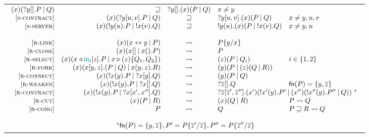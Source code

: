 \begin{table}
\begin{tabular}{@{}c@{}}
\begin{math}
\begin{array}{rrcll}
            \Cut\x{\Weaken\y.P}{Q} & \pcong & \Weaken\y.\Cut\x{P}{Q} & x \ne y \\
            \SContract &
            \Cut\x{\Contract\y\u\v.P}{Q} & \pcong & \Contract\y\u\v.\Cut\x{P}{Q} & x \ne y,u,v \\
            \SServer &
            \Cut\x{\Server\y\u.P}{\Server\x\v.Q} & \pcong & \Server\y\u.\Cut\x{P}{\Server\x\v.Q} & x \ne y,u \\
            \\
            \RLink &
            \Cut\x{\Link\x\y}{P} & \red & P\subst\y\x \\
            \RClose &
            \Cut\x{\Close\x}{\Wait\x.P} & \red & P \\
            \RSelect &
            \Cut\x{\Select\x{\InTag_i}\z.P}{\Case\x\z{Q_1}{Q_2}} & \red & \Cut\z{P}{Q_i} & i\in\set{1,2} \\
            \RFork &
            \Cut\x{\Fork\x\y\z{P}{Q}}{\Join\x\y\z.R} & \red & \Cut\y{P}{\Cut\z{Q}{R}} \\
            \RConnect &
            \Cut\x{\Server\x\y.P}{\Client\x\y.Q} & \red & \Cut\y{P}{Q} \\
            \RWeaken &
            \Cut\x{\Server\x\y.P}{\Weaken\x.Q} & \red & \Weaken{\seqof\z}.Q
            & \fn{P} = \set{y,\seqof\z} \\
            \RContract &
            \Cut\x{\Server\x\y.P}{\Contract\x{x'}{x''}.Q} & \red &
            \multicolumn{2}{l}{
                \Contract{\seqof\z}{\seqof\z'}{\seqof\z''}.\Cut{x'}{
                    \Server{x'}\y.P'
                }{
                    \Cut{x''}{
                        \Server{x''}\y.P''
                    }{
                        Q
                    }
                }
                ~^*
            }
            \\
            \RCut &
            \Cut\x{P}{R} & \red & \Cut\x{Q}{R} & P \red Q \\
            \RCong &
            P & \red & Q & P \pcong R \red Q \\
            \\
            \multicolumn{5}{c}{
                ~^*
                \fn{P} = \set{y,\seqof\z},
                P' = P\subst{\seqof\z'}{\seqof\z},
                P'' = P\subst{\seqof\z''}{\seqof\z}
            }
            \end{array}
        \end{math}
    \end{tabular}
\end{table}

